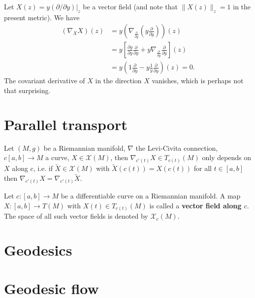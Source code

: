 \documentclass[letter-paper]{tufte-book}
\newenvironment{example}[1][Example]{\begin{trivlist}
\item[\hskip \labelsep {\bfseries #1}]}{\end{trivlist}}
\begin{document}
\begin{example}
  Let $X(z) = y(\partial / \partial y)|_z$ be a vector field (and note that $\|X(z)\|_z = 1$ in the present metric). We have
  \begin{align*}
    (\nabla_X X)(z) 
      &= y\left( \nabla_{\frac{\partial}{\partial y}} \left( y\frac{\partial}{\partial y} \right) \right)(z)\\
      &= y\left[\frac{\partial y}{\partial y}\frac{\partial}{\partial y} + y \nabla_{\frac{\partial}{\partial y}} \frac{\partial}{\partial y} \right](z)\\
      &= y\left( 1\frac{\partial}{\partial y} - y \frac{1}{y}\frac{\partial}{\partial y}\right)(z) = 0.
  \end{align*}
  The covariant derivative of $X$ in the direction $X$ vanishes, which is perhaps not that surprising.
\end{example}


\section{Parallel transport}

Let $(M,g)$ be a Riemannian manifold, $\nabla$ the Levi-Civita connection, $c[a,b] \to M$ a curve, $X \in \mathcal{X}(M)$, then $\nabla_{c'(t)} X \in T_{c(t)}(M)$ only depends on $X$ along $c$, i.e. if $\tilde{X} \in \mathcal{X}(M)$ with $\tilde{X}(c(t)) = X(c(t))$ for all $t \in [a,b]$ then $\nabla_{c'(t)}X = \nabla_{c'(t)} \tilde{X}$.

Let $c:[a,b] \to M$ be a differentiable curve on a Riemannian manifold. A map $X:[a,b] \to T(M)$ with $X(t) \in T_{c(t)}(M)$ is called a \textbf{vector field along $c$}. The space of all such vector fields is denoted by $\mathcal{X}_c(M)$.


\section{Geodesics}


\section{Geodesic flow}
\end{document}
